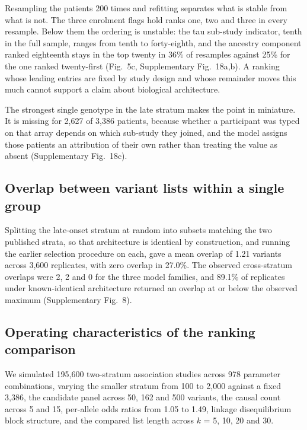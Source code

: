 \documentclass[10pt]{article}
\begin{document}
Resampling the patients 200 times and refitting separates what is stable from what is not. The
three enrolment flags hold ranks one, two and three in every resample. Below them the ordering is
unstable: the tau sub-study indicator, tenth in the full sample, ranges from tenth to
forty-eighth, and the ancestry component ranked eighteenth stays in the top twenty in 36\% of
resamples against 25\% for the one ranked twenty-first (Fig.~5c, Supplementary Fig.~18a,b). A ranking whose leading entries are fixed by study
design and whose remainder moves this much cannot support a claim about biological architecture.

The strongest single genotype in the late stratum makes the point in miniature. It is missing for
2,627 of 3,386 patients, because whether a participant was typed on that array depends on which
sub-study they joined, and the model assigns those patients an attribution of their own rather
than treating the value as absent (Supplementary Fig.~18c).

\subsection*{Overlap between variant lists within a single group}

Splitting the late-onset stratum at random into subsets matching the two published strata, so
that architecture is identical by construction, and running the earlier selection procedure on
each, gave a mean overlap of 1.21 variants across 3,600 replicates, with zero overlap in 27.0\%.
The observed cross-stratum overlaps were 2, 2 and 0 for the three model families, and 89.1\% of
replicates under known-identical architecture returned an overlap at or below the observed
maximum (Supplementary Fig.~8).

\subsection*{Operating characteristics of the ranking comparison}

We simulated 195,600 two-stratum association studies across 978 parameter combinations, varying
the smaller stratum from 100 to 2,000 against a fixed 3,386, the candidate panel across 50, 162
and 500 variants, the causal count across 5 and 15, per-allele odds ratios from 1.05 to 1.49,
linkage disequilibrium block structure, and the compared list length across $k$ = 5, 10, 20 and
30.
\end{document}
